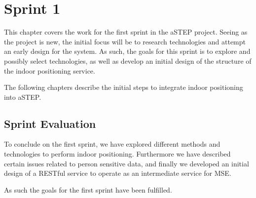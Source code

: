 \chapter{Sprint 1}
This chapter covers the work for the first sprint in the aSTEP project. Seeing as the project is new, the initial focus will be to research technologies and attempt an early design for the system. As such, the goals for this sprint is to explore and possibly select technologies, as well as develop an initial design of the structure of the indoor positioning service. 

The following chapters describe the initial steps to integrate indoor positioning into aSTEP.





\section{Sprint Evaluation}
To conclude on the first sprint, we have explored different methods and technologies to perform indoor positioning. Furthermore we have described certain issues related to person sensitive data, and finally we developed an initial design of a RESTful service to operate as an intermediate service for MSE. 

As such the goals for the first sprint have been fulfilled.